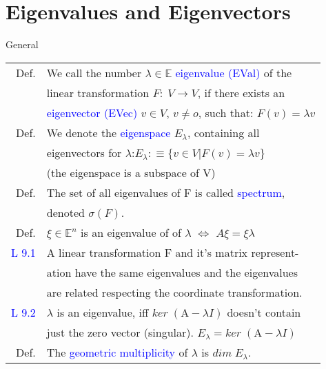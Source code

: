 \section{Eigenvalues and Eigenvectors}
\begin{mainbox}{General}
\setlength{\tabcolsep}{2pt}
\begin{tabular}{rl}
	Def. & We call the number $\lambda\in\mathbb{E}$ \textcolor{blue}{eigenvalue (EVal)} of the\\
	& linear transformation $F:\;V\rightarrow V$, if there exists an\\
	& \textcolor{blue}{eigenvector (EVec)} $v\in V$, $v\neq o$, such that: $F(v) = \lambda v$\\
	\rule{0pt}{3ex}
	Def. & We denote the \textcolor{blue}{eigenspace} $E_\lambda$, containing all\\
	& eigenvectors for $\lambda$:\quad $E_\lambda :\equiv \{v\in V | F(v) = \lambda v\}$\\
	& (the eigenspace is a subspace of V)\\
	\rule{0pt}{3ex}
	Def. & The set of all eigenvalues of F is called \textcolor{blue}{spectrum},\\
	& denoted $\sigma (F)$.\\
	\rule{0pt}{3ex}
	Def. & $\xi\in\mathbb{E}^n$ is an eigenvalue of of $\lambda$ $\Leftrightarrow$ $A\xi = \xi\lambda$\\
	\rule{0pt}{3ex}
	\textcolor{blue}{L 9.1} & A linear transformation F and it's matrix represent-\\
	& ation have the same eigenvalues and the eigenvalues\\
	& are related respecting the coordinate transformation.\\
	\rule{0pt}{3ex}
	\textcolor{blue}{L 9.2} & $\lambda$ is an eigenvalue, iff $ker\;(\text{A}-\lambda I)$ doesn't contain\\
	& just the zero vector (singular). $E_\lambda = ker\;(\text{A}-\lambda I)$\\
	\rule{0pt}{3ex}
	Def. & The \textcolor{blue}{geometric multiplicity} of $\lambda$ is $dim\;E_\lambda$.\\
\end{tabular}
\end{mainbox}